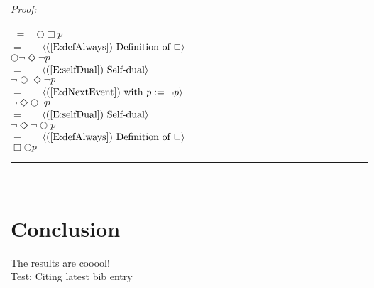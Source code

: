 \documentclass[fleqn, leqno]{article}
\newcommand{\lgap}{2pt}                             %
\newcommand{\mymathindent}{24pt}                      %
\newcommand{\next}{\bigcirc}
\newcommand{\event}{\Diamond}
\newcommand{\always}{\Box}
\newcommand{\myqed}{\hfill\rule[-.23ex]{1.2ex}{2.0ex}}
\newcommand{\Gll} {\langle}                         %
\newcommand{\Ggg} {\rangle}                         %
\newcommand{\Hint}[1]     {\ \ \ $\Gll              \mbox{#1} \Ggg$ }   %
\begin{document}
\emph{Proof:}
\begin{tabbing}
\hspace{\mymathindent} \= $= \;$ \= \kill
  \> \>   $\next\always p$\\[\lgap]
  \> $=$  \>  \Hint{(\ref{E:defAlways}) Definition of $\always$}\\[\lgap]
  \> \>   $\next\lnot\event\lnot p$\\[\lgap]
  \> $=$  \>  \Hint{(\ref{E:selfDual}) Self-dual}\\[\lgap]
  \> \>   $\lnot\next\event\lnot p$\\[\lgap]
  \> $=$  \>  \Hint{(\ref{E:dNextEvent}) with $p := \lnot p$}\\[\lgap]
  \> \>   $\lnot\event\next\lnot p$\\[\lgap]
  \> $=$  \>  \Hint{(\ref{E:selfDual}) Self-dual}\\[\lgap]
  \> \>   $\lnot\event\lnot\next p$\\[\lgap]
  \> $=$  \>  \Hint{(\ref{E:defAlways}) Definition of $\always$}\\[\lgap]
  \> \>   $\always\next p$\\[\lgap]
\end{tabbing}
\myqed\\[\lgap]



\section*{Conclusion}

The results are cooool!\\

Test: Citing latest bib entry\cite{GandS}\\



\end{document}
